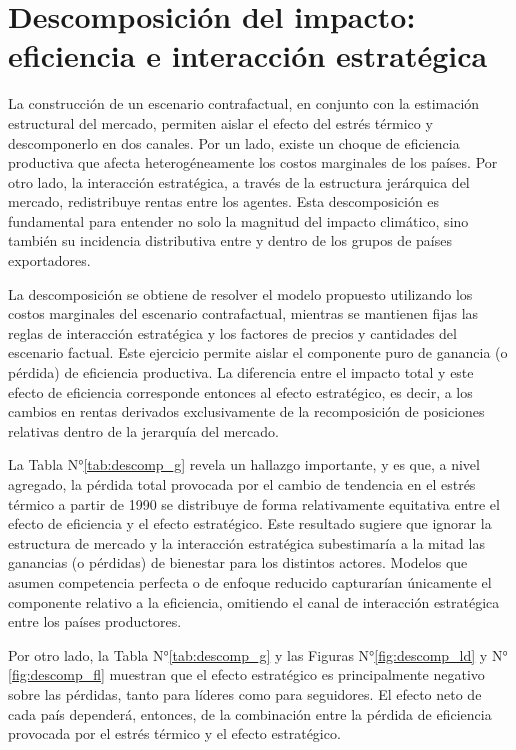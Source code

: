 \section{Descomposición del impacto: eficiencia e interacción estratégica}

La construcción de un escenario contrafactual, en conjunto con la estimación estructural del mercado, permiten aislar el efecto del estrés térmico y descomponerlo en dos canales. Por un lado, existe un choque de eficiencia productiva que afecta heterogéneamente los costos marginales de los países. Por otro lado, la interacción estratégica, a través de la estructura jerárquica del mercado, redistribuye rentas entre los agentes. Esta descomposición es fundamental para entender no solo la magnitud del impacto climático, sino también su incidencia distributiva entre y dentro de los grupos de países exportadores.

La descomposición se obtiene de resolver el modelo propuesto utilizando los costos marginales del escenario contrafactual, mientras se mantienen fijas las reglas de interacción estratégica y los factores de precios y cantidades del escenario factual. Este ejercicio permite aislar el componente puro de ganancia (o pérdida) de eficiencia productiva. La diferencia entre el impacto total y este efecto de eficiencia corresponde entonces al efecto estratégico, es decir, a los cambios en rentas derivados exclusivamente de la recomposición de posiciones relativas dentro de la jerarquía del mercado.

La Tabla N°\ref{tab:descomp_g} revela un hallazgo importante, y es que, a nivel agregado, la pérdida total provocada por el cambio de tendencia en el estrés térmico a partir de 1990 se distribuye de forma relativamente equitativa entre el efecto de eficiencia y el efecto estratégico. Este resultado sugiere que ignorar la estructura de mercado y la interacción estratégica subestimaría a la mitad las ganancias (o pérdidas) de bienestar para los distintos actores. Modelos que asumen competencia perfecta o de enfoque reducido capturarían únicamente el componente relativo a la eficiencia, omitiendo el canal de interacción estratégica entre los países productores.

Por otro lado, la Tabla N°\ref{tab:descomp_g} y las Figuras N°\ref{fig:descomp_ld} y N°\ref{fig:descomp_fl} muestran que el efecto estratégico es principalmente negativo sobre las pérdidas, tanto para líderes como para seguidores. El efecto neto de cada país dependerá, entonces, de la combinación entre la pérdida de eficiencia provocada por el estrés térmico y el efecto estratégico.

